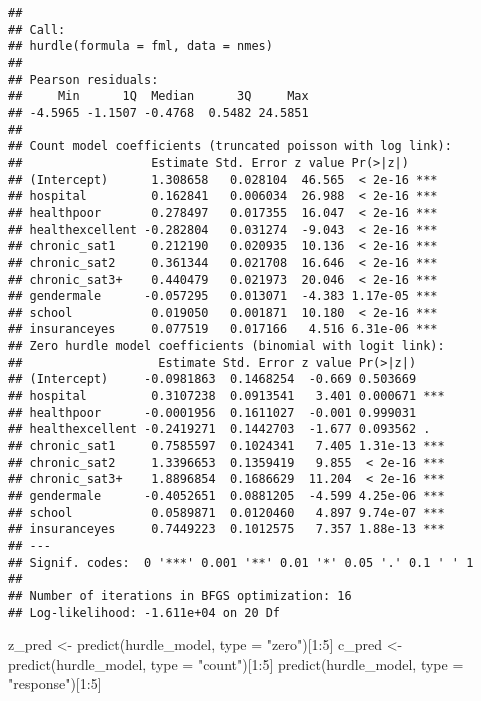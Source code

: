 \documentclass[
  oneside]{book}
\newenvironment{Shaded}{\begin{snugshade}}{\end{snugshade}}
\newcommand{\AttributeTok}[1]{\textcolor[rgb]{0.77,0.63,0.00}{#1}}
\newcommand{\DecValTok}[1]{\textcolor[rgb]{0.00,0.00,0.81}{#1}}
\newcommand{\FunctionTok}[1]{\textcolor[rgb]{0.00,0.00,0.00}{#1}}
\newcommand{\NormalTok}[1]{#1}
\newcommand{\OtherTok}[1]{\textcolor[rgb]{0.56,0.35,0.01}{#1}}
\newcommand{\SpecialCharTok}[1]{\textcolor[rgb]{0.00,0.00,0.00}{#1}}
\newcommand{\StringTok}[1]{\textcolor[rgb]{0.31,0.60,0.02}{#1}}
\begin{document}
\begin{verbatim}
## 
## Call:
## hurdle(formula = fml, data = nmes)
## 
## Pearson residuals:
##     Min      1Q  Median      3Q     Max 
## -4.5965 -1.1507 -0.4768  0.5482 24.5851 
## 
## Count model coefficients (truncated poisson with log link):
##                  Estimate Std. Error z value Pr(>|z|)    
## (Intercept)      1.308658   0.028104  46.565  < 2e-16 ***
## hospital         0.162841   0.006034  26.988  < 2e-16 ***
## healthpoor       0.278497   0.017355  16.047  < 2e-16 ***
## healthexcellent -0.282804   0.031274  -9.043  < 2e-16 ***
## chronic_sat1     0.212190   0.020935  10.136  < 2e-16 ***
## chronic_sat2     0.361344   0.021708  16.646  < 2e-16 ***
## chronic_sat3+    0.440479   0.021973  20.046  < 2e-16 ***
## gendermale      -0.057295   0.013071  -4.383 1.17e-05 ***
## school           0.019050   0.001871  10.180  < 2e-16 ***
## insuranceyes     0.077519   0.017166   4.516 6.31e-06 ***
## Zero hurdle model coefficients (binomial with logit link):
##                   Estimate Std. Error z value Pr(>|z|)    
## (Intercept)     -0.0981863  0.1468254  -0.669 0.503669    
## hospital         0.3107238  0.0913541   3.401 0.000671 ***
## healthpoor      -0.0001956  0.1611027  -0.001 0.999031    
## healthexcellent -0.2419271  0.1442703  -1.677 0.093562 .  
## chronic_sat1     0.7585597  0.1024341   7.405 1.31e-13 ***
## chronic_sat2     1.3396653  0.1359419   9.855  < 2e-16 ***
## chronic_sat3+    1.8896854  0.1686629  11.204  < 2e-16 ***
## gendermale      -0.4052651  0.0881205  -4.599 4.25e-06 ***
## school           0.0589871  0.0120460   4.897 9.74e-07 ***
## insuranceyes     0.7449223  0.1012575   7.357 1.88e-13 ***
## ---
## Signif. codes:  0 '***' 0.001 '**' 0.01 '*' 0.05 '.' 0.1 ' ' 1 
## 
## Number of iterations in BFGS optimization: 16 
## Log-likelihood: -1.611e+04 on 20 Df
\end{verbatim}

\begin{Shaded}
\begin{Highlighting}[]
\NormalTok{z\_pred }\OtherTok{\textless{}{-}} \FunctionTok{predict}\NormalTok{(hurdle\_model, }\AttributeTok{type =} \StringTok{"zero"}\NormalTok{)[}\DecValTok{1}\SpecialCharTok{:}\DecValTok{5}\NormalTok{]}
\NormalTok{c\_pred }\OtherTok{\textless{}{-}} \FunctionTok{predict}\NormalTok{(hurdle\_model, }\AttributeTok{type =} \StringTok{"count"}\NormalTok{)[}\DecValTok{1}\SpecialCharTok{:}\DecValTok{5}\NormalTok{]}
\FunctionTok{predict}\NormalTok{(hurdle\_model, }\AttributeTok{type =} \StringTok{"response"}\NormalTok{)[}\DecValTok{1}\SpecialCharTok{:}\DecValTok{5}\NormalTok{]}
\end{Highlighting}
\end{Shaded}
\end{document}
